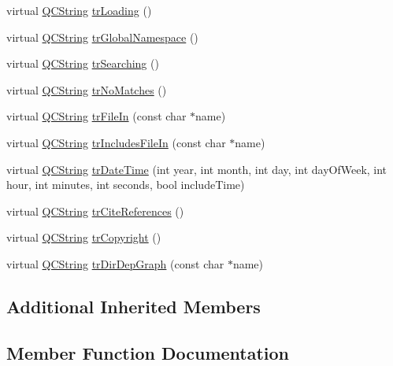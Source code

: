 \begin{DoxyCompactItemize}
\item 
virtual \mbox{\hyperlink{class_q_c_string}{Q\+C\+String}} \mbox{\hyperlink{class_translator_armenian_af75078cf1f25d5e91c79a9ab62ea1ac6}{tr\+Loading}} ()
\item 
virtual \mbox{\hyperlink{class_q_c_string}{Q\+C\+String}} \mbox{\hyperlink{class_translator_armenian_a718905c6683f767993fb42ff2fb86107}{tr\+Global\+Namespace}} ()
\item 
virtual \mbox{\hyperlink{class_q_c_string}{Q\+C\+String}} \mbox{\hyperlink{class_translator_armenian_a352005ced78b82da4bd96c626bb1fc4e}{tr\+Searching}} ()
\item 
virtual \mbox{\hyperlink{class_q_c_string}{Q\+C\+String}} \mbox{\hyperlink{class_translator_armenian_af16ff10c1579eeaed8643b654223b59e}{tr\+No\+Matches}} ()
\item 
virtual \mbox{\hyperlink{class_q_c_string}{Q\+C\+String}} \mbox{\hyperlink{class_translator_armenian_af5d985e19a1226edad471f71af530275}{tr\+File\+In}} (const char $\ast$name)
\item 
virtual \mbox{\hyperlink{class_q_c_string}{Q\+C\+String}} \mbox{\hyperlink{class_translator_armenian_af2a4a618cdf3af2ac4be6779c2b79896}{tr\+Includes\+File\+In}} (const char $\ast$name)
\item 
virtual \mbox{\hyperlink{class_q_c_string}{Q\+C\+String}} \mbox{\hyperlink{class_translator_armenian_a6281ed0a3cf72b694c837c8153136baa}{tr\+Date\+Time}} (int year, int month, int day, int day\+Of\+Week, int hour, int minutes, int seconds, bool include\+Time)
\item 
virtual \mbox{\hyperlink{class_q_c_string}{Q\+C\+String}} \mbox{\hyperlink{class_translator_armenian_a26da4084271759771361792d43a91d11}{tr\+Cite\+References}} ()
\item 
virtual \mbox{\hyperlink{class_q_c_string}{Q\+C\+String}} \mbox{\hyperlink{class_translator_armenian_a3556a8b0bd648ff9659540c1e2d3003e}{tr\+Copyright}} ()
\item 
virtual \mbox{\hyperlink{class_q_c_string}{Q\+C\+String}} \mbox{\hyperlink{class_translator_armenian_a8ce2837746d4329f149e0d94a1b3cf76}{tr\+Dir\+Dep\+Graph}} (const char $\ast$name)
\end{DoxyCompactItemize}
\subsection*{Additional Inherited Members}


\subsection{Member Function Documentation}
\mbox{\label{class_translator_armenian_a71f58cc43e701c54540c1525bd96aa71}} 
